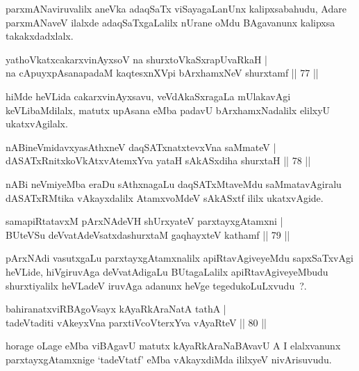 \begin{artha}
parxmANaviruvalilx aneVka adaqSaTx viSayagaLanUnx kalipxsabahudu, Adare parxmANaveV ilalxde adaqSaTxgaLalilx nUrane oMdu BAgavanunx kalipxsa takakxdadxlalx.
\end{artha}


\begin{shl}
yathoVkatxcakarxvinAyxsoV na shurxtoV\s kaSxrapUvaRkaH |\\
na cApuyxpAsanapadaM kaqtesxnXV\s pi bArxhamxNeV shurxtamf \hfill || 77 ||
\end{shl}

\begin{artha}
hiMde heVLida cakarxvinAyxsavu, veVdAkaSxragaLa mUlakavAgi keVLibaMdilalx, matutx upAsana eMba padavU bArxhamxNadalilx elilxyU ukatxvAgilalx.
\end{artha}

\begin{shl}
nABineVmidavxyasAthxneV daqSATxnatxtevxVna saMmateV |\\
dASATxRnitxkoVkAtxvAtemxYva yataH sAkASxdiha shurxtaH \hfill || 78 ||
\end{shl}

\begin{artha}
nABi neVmiyeMba eraDu sAthxnagaLu daqSATxMtaveMdu saMmatavAgiralu dASATxRMtika vAkayxdalilx AtamxvoMdeV sAkASxtf ililx ukatxvAgide.
\end{artha}

\begin{shl}
samapiRtatavxM pArxNAdeVH shUrxyateV parxtayxgAtamxni |\\
BUteVSu deVvatAdeVsatxdashurxtaM gaqhayxteV kathamf \hfill || 79 ||
\end{shl}

\begin{artha}
pArxNAdi vasutxgaLu parxtayxgAtamxnalilx apiRtavAgiveyeMdu sapxSaTxvAgi heVLide, hiVgiruvAga deVvatAdigaLu BUtagaLalilx apiRtavAgiveyeMbudu shurxtiyalilx heVLadeV iruvAga adanunx heVge tegedukoLuLxvudu~?.
\end{artha}

\begin{shl}
bahiranatxviRBAgoV\s sayx kAyaRkAraNatA tathA |\\
tadeVtaditi vAkeyxVna parxtiVcoV\s terxYva vAyaRteV \hfill || 80 ||
\end{shl}

\begin{artha}
horage oLage eMba viBAgavU matutx kAyaRkAraNaBAvavU A I elalxvanunx parxtayxgAtamxnige `tadeVtatf' eMba vAkayxdiMda ililxyeV nivArisuvudu.
\end{artha}

